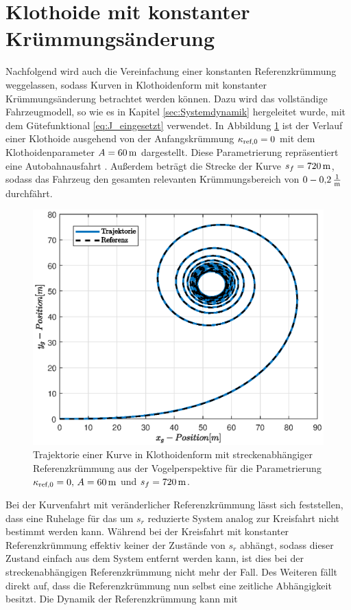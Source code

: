 \section{Klothoide mit konstanter Krümmungsänderung}\label{sec:Klothoide}
Nachfolgend wird auch die Vereinfachung einer konstanten Referenzkrümmung weggelassen, sodass Kurven in Klothoidenform mit konstanter Krümmungsänderung betrachtet werden können. Dazu wird das vollständige Fahrzeugmodell, so wie es in Kapitel \ref{sec:Systemdynamik} hergeleitet wurde, mit dem Gütefunktional \eqref{eq:J_eingesetzt} verwendet. In Abbildung \ref{fig:xy_pos_klothoide} ist der Verlauf einer Klothoide ausgehend von der Anfangskrümmung $\kappa_{\textrm{ref},0} = 0$ mit dem Klothoidenparameter $A = 60\,\mathrm{m}$ dargestellt. Diese Parametrierung repräsentiert eine Autobahnausfahrt \cite{ForschungsgesellschaftfurStraenundVerkehrswesen.2008}. Außerdem beträgt die Strecke der Kurve $s_f = 720\,\mathrm{m}$, sodass das Fahrzeug den gesamten relevanten Krümmungsbereich von $0-0{,}2\,\mathrm{\frac{\mathrm{1}}{\mathrm{m}}}$ durchfährt. 
\begin{figure}[h] 
	\centering
	\includegraphics[width=0.7\linewidth]{./Bilder/Ergebnisse/Klothoide/Ohne_umax/xy_pos.eps}
	\caption{Trajektorie einer Kurve in Klothoidenform mit streckenabhängiger Referenzkrümmung aus der Vogelperspektive für die Parametrierung $\kappa_{\textrm{ref},0} = 0,\, A = 60\,\mathrm{m}$ und $s_f = 720\,\mathrm{m}$.}
	\label{fig:xy_pos_klothoide}
\end{figure} 
Bei der Kurvenfahrt mit veränderlicher Referenzkrümmung lässt sich feststellen, dass eine Ruhelage für das um $s_r$ reduzierte System analog zur Kreisfahrt nicht bestimmt werden kann. Während bei der Kreisfahrt mit konstanter Referenzkrümmung effektiv keiner der Zustände von $s_r$ abhängt, sodass dieser Zustand einfach aus dem System entfernt werden kann, ist dies bei der streckenabhängigen Referenzkrümmung nicht mehr der Fall. Des Weiteren fällt direkt auf, dass die Referenzkrümmung nun selbst eine zeitliche Abhängigkeit besitzt. Die Dynamik der Referenzkrümmung kann mit 
